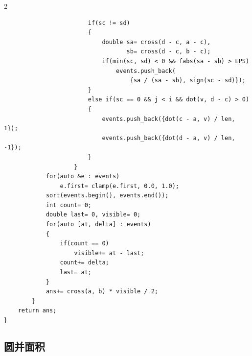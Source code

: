 \documentclass[UTF8,fontset=fandol,a4paper,twoside]{ctexart}
\begin{document}
\begin{multicols}{2}
\begin{lstlisting}
                        if(sc != sd)
                        {
                            double sa= cross(d - c, a - c),
                                   sb= cross(d - c, b - c);
                            if(min(sc, sd) < 0 && fabs(sa - sb) > EPS)
                                events.push_back(
                                    {sa / (sa - sb), sign(sc - sd)});
                        }
                        else if(sc == 0 && j < i && dot(v, d - c) > 0)
                        {
                            events.push_back({dot(c - a, v) / len, 1});
                            events.push_back({dot(d - a, v) / len, -1});
                        }
                    }
            for(auto &e : events)
                e.first= clamp(e.first, 0.0, 1.0);
            sort(events.begin(), events.end());
            int count= 0;
            double last= 0, visible= 0;
            for(auto [at, delta] : events)
            {
                if(count == 0)
                    visible+= at - last;
                count+= delta;
                last= at;
            }
            ans+= cross(a, b) * visible / 2;
        }
    return ans;
}
\end{lstlisting}
\subsection{圆并面积}


\end{multicols}
\end{document}
